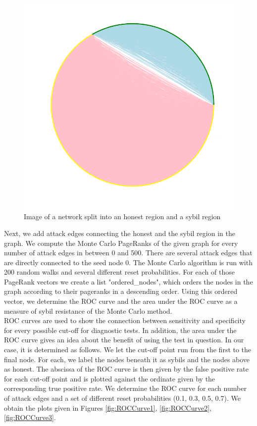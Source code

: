 \documentclass[twocolumn]{article}
\theoremstyle{definition}
\theoremstyle{theorem}
\begin{document}
\begin{figure}
\includegraphics[scale=0.3]{SybilRegion}
\caption{Image of a network split into an honest region and a sybil region}
\label{fig:SybilRegion}
\end{figure}

\noindent Next, we add attack edges connecting the honest and the sybil region in the graph. We compute the Monte Carlo PageRanks of the given graph for every number of attack edges in between 0 and 500. There are several attack edges that are directly connected to the seed node 0. The Monte Carlo algorithm is run with 200 random walks and several different reset probabilities. For each of those PageRank vectors we create a list "ordered\_{}nodes", which orders the nodes in the graph according to their pageranks in a descending order. Using this ordered vector, we determine the ROC curve and the area under the ROC curve as a measure of sybil resistance of the Monte Carlo method. \vspace{1em}\\

\noindent ROC curves are used to show the connection between sensitivity and specificity for every possible cut-off for diagnostic tests. In addition, the area under the ROC curve gives an idea about the benefit of using the test in question. In our case, it is determined as follows. We let the cut-off point run from the first to the final node. For each, we label the nodes beneath it as sybils and the nodes above as honest. The abscissa of the ROC curve is then given by the false positive rate for each cut-off point and is plotted against the ordinate given by the corresponding true positive rate. We determine the ROC curve for each number of attack edges and a set of different reset probabilities (0.1, 0.3, 0.5, 0.7). We obtain the plots given in Figures \ref{fig:ROCCurve1}, \ref{fig:ROCCurve2}, \ref{fig:ROCCurve3}.\vspace{1em}\\
\end{document}

